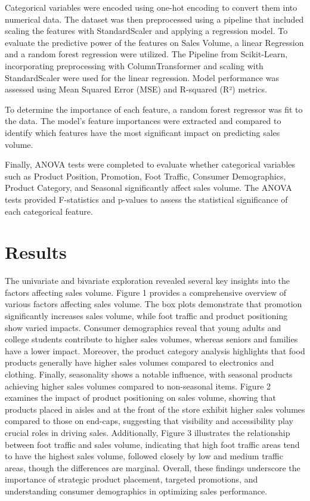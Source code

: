 \documentclass[stu,12pt,floatsintext]{apa7}
\begin{document}
Categorical variables were encoded using one-hot encoding to convert them into numerical data. The dataset was then preprocessed using a pipeline that included scaling the features with StandardScaler and applying a regression model. To evaluate the predictive power of the features on Sales Volume, a linear Regression and a random forest regression were utilized. The Pipeline from Scikit-Learn, incorporating preprocessing with ColumnTransformer and scaling with StandardScaler were used for the linear regression. Model performance was assessed using Mean Squared Error (MSE) and R-squared (R²) metrics.

To determine the importance of each feature, a random forest regressor was fit to the data. The model's feature importances were extracted and compared to identify which features have the most significant impact on predicting sales volume.

Finally, ANOVA tests were completed to evaluate whether categorical variables such as Product Position, Promotion, Foot Traffic, Consumer Demographics, Product Category, and Seasonal significantly affect sales volume. The ANOVA tests provided F-statistics and p-values to assess the statistical significance of each categorical feature.


\section{Results}

The univariate and bivariate exploration revealed several key insights into the factors affecting sales volume. Figure 1 provides a comprehensive overview of various factors affecting sales volume. The box plots demonstrate that promotion significantly increases sales volume, while foot traffic and product positioning show varied impacts. Consumer demographics reveal that young adults and college students contribute to higher sales volumes, whereas seniors and families have a lower impact. Moreover, the product category analysis highlights that food products generally have higher sales volumes compared to electronics and clothing. Finally, seasonality shows a notable influence, with seasonal products achieving higher sales volumes compared to non-seasonal items. Figure 2 examines the impact of product positioning on sales volume, showing that products placed in aisles and at the front of the store exhibit higher sales volumes compared to those on end-caps, suggesting that visibility and accessibility play crucial roles in driving sales. Additionally, Figure 3 illustrates the relationship between foot traffic and sales volume, indicating that high foot traffic areas tend to have the highest sales volume, followed closely by low and medium traffic areas, though the differences are marginal. Overall, these findings underscore the importance of strategic product placement, targeted promotions, and understanding consumer demographics in optimizing sales performance.
\end{document}
